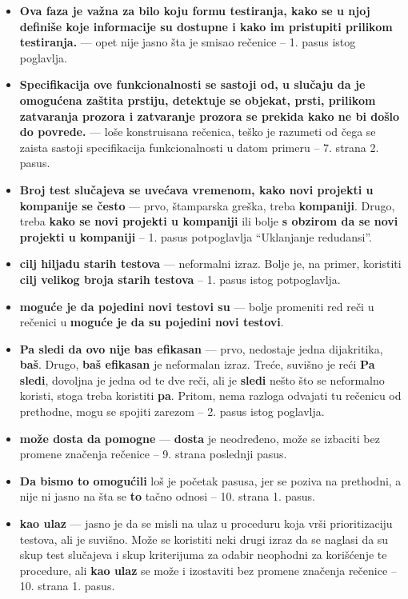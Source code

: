 \documentclass[a4paper]{report}
\begin{document}
\begin{itemize}
\item {\bf{Ova faza je važna za bilo koju formu testiranja, kako se u njoj definiše koje informacije su dostupne i kako im pristupiti prilikom testiranja.}} --- opet nije jasno šta je smisao rečenice -- 1. pasus istog poglavlja.
\item {\bf{Specifikacija ove funkcionalnosti se sastoji od, u slučaju da je omogućena zaštita prstiju, detektuje se objekat, prsti, prilikom zatvaranja prozora i zatvaranje prozora se prekida kako ne bi došlo do povrede.}} --- loše konstruisana rečenica, teško je razumeti od čega se zaista sastoji specifikacija funkcionalnosti u datom primeru -- 7. strana 2. pasus.
\item {\bf{Broj test slučajeva se uvećava vremenom, kako novi projekti u kompanije se često}} --- prvo, štamparska greška, treba {\bf{kompaniji}}. Drugo, treba {\bf{kako se novi projekti u kompaniji}} ili bolje {\bf{s obzirom da se novi projekti u kompaniji}} -- 1. pasus potpoglavlja ``Uklanjanje redudansi''.
\item {\bf{cilj hiljadu starih testova}} --- neformalni izraz. Bolje je, na primer, koristiti {\bf{cilj velikog broja starih testova}} -- 1. pasus istog potpoglavlja.
\item {\bf{moguće je da pojedini novi testovi su}} --- bolje promeniti red reči u rečenici u {\bf{moguće je da su pojedini novi testovi}}.
\item {\bf{Pa sledi da ovo nije bas efikasan}} --- prvo, nedostaje jedna dijakritika, {\bf{baš}}. Drugo, {\bf{baš efikasan}} je neformalan izraz. Treće, suvišno je reći {\bf{Pa sledi}}, dovoljna je jedna od te dve reči, ali je {\bf{sledi}} nešto što se neformalno koristi, stoga treba koristiti {\bf{pa}}. Pritom, nema razloga odvajati tu rečenicu od prethodne, mogu se spojiti zarezom -- 2. pasus istog poglavlja.
\item {\bf{može dosta da pomogne}} --- {\bf{dosta}} je neodređeno, može se izbaciti bez promene značenja rečenice -- 9. strana poslednji pasus.
\item {\bf{Da bismo to omogućili}} loš je početak pasusa, jer se poziva na prethodni, a nije ni jasno na šta se {\bf{to}} tačno odnosi -- 10. strana 1. pasus.
\item {\bf{kao ulaz}} --- jasno je da se misli na ulaz u proceduru koja vrši prioritizaciju testova, ali je suvišno. Može se koristiti neki drugi izraz da se naglasi da su skup test slučajeva i skup kriterijuma za odabir neophodni za korišćenje te procedure, ali {\bf{kao ulaz}} se može i izostaviti bez promene značenja rečenice -- 10. strana 1. pasus.

\end{itemize}
\end{document}
